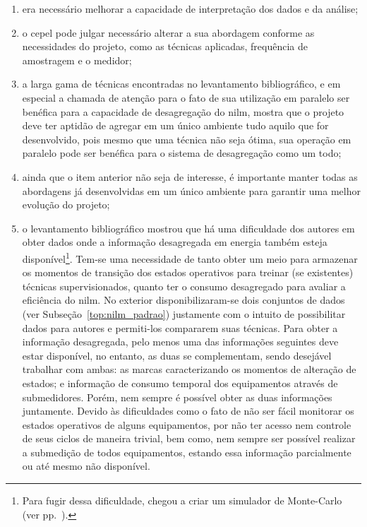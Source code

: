 \begin{enumerate}[label={Item} \arabic* - ,ref=\arabic*,align=left]
\item\label{itm:dif1} era necessário melhorar a capacidade de
interpretação dos dados e da análise;
\item\label{itm:dif2} o \acs{cepel} pode julgar necessário alterar a
sua abordagem conforme as necessidades do projeto, como as técnicas
aplicadas, frequência de amostragem e o medidor;
\item\label{itm:dif3} a larga gama de técnicas encontradas no
levantamento bibliográfico, e em especial a chamada de atenção para o
fato de sua utilização em paralelo ser benéfica para a capacidade de
desagregação do \gls{nilm}, mostra que o projeto deve ter aptidão de
agregar em um único ambiente tudo aquilo que for desenvolvido, pois
mesmo que uma técnica não seja ótima, sua operação em paralelo pode
ser benéfica para o sistema de desagregação como um todo;
\item\label{itm:dif4} ainda que o item anterior não seja de interesse,
é importante manter todas as abordagens já desenvolvidas em um único
ambiente para garantir uma melhor evolução do projeto;
\item\label{itm:dif5} o levantamento bibliográfico mostrou que há uma
dificuldade dos autores em obter dados onde a informação desagregada
em energia também esteja disponível\footnote{Para fugir dessa
dificuldade, \cite{nilm_liang_pt2_2010_40} chegou a criar um simulador
de Monte-Carlo (ver pp.~\pageref{nilm:multiplas_tecnicas}).}. Tem-se uma
necessidade de tanto obter um meio para armazenar os momentos de
transição dos estados operativos para treinar (se existentes) técnicas
supervisionados, quanto ter o consumo desagregado para avaliar a
eficiência do \gls{nilm}. No exterior disponibilizaram-se dois
conjuntos de dados (ver Subseção~\ref{top:nilm_padrao}) justamente
com o intuito de possibilitar dados para autores e permiti-los
compararem suas técnicas. Para obter a informação desagregada, pelo
menos uma das informações seguintes deve estar disponível, no entanto,
as duas se complementam, sendo desejável trabalhar com ambas: as
marcas caracterizando os momentos de alteração de estados;
e informação de consumo temporal dos equipamentos através de submedidores.
Porém, nem sempre é possível obter as duas informações juntamente.
Devido às dificuldades como o fato de não ser fácil monitorar os estados
operativos de alguns equipamentos, por não ter acesso nem controle de seus
ciclos de maneira trivial, bem como, nem sempre ser possível realizar a
submedição de todos equipamentos, estando essa informação parcialmente ou
até mesmo não disponível.
\end{enumerate}

